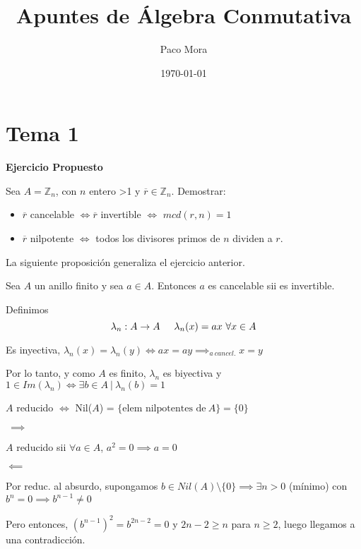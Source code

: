 \documentclass[openany]{book}
\title{Apuntes de Álgebra Conmutativa}
\author{Paco Mora}
\date{\today}
\begin{document}
\maketitle

\tableofcontents

\chapter{Tema 1}

\begin{exercise}
    \textbf{Ejercicio Propuesto}

    Sea $ A = \mathbb{Z}_{n} $, con $ n  $ entero >1 y $ \overline{r} \in \mathbb{Z}_{n} $. Demostrar:
    \begin{itemize}
        \item $ \overline{r} $ cancelable $ \iff \overline{r}$ invertible $ \iff $ $ mcd(r,n)=1 $
        \item $ \overline{r} $ nilpotente $ \iff $ todos los divisores primos de $ n $ dividen a $ r $.
    \end{itemize}
\end{exercise}

La siguiente proposición generaliza el ejercicio anterior.

\begin{proposition}
    Sea $ A  $ un anillo finito y sea $ a \in A $. Entonces $ a  $ es cancelable sii es invertible.
\end{proposition}

\begin{demonstration}

    Definimos
    $$ \lambda_n: A \to A\hspace{5mm} \lambda_n(x)=ax\ \forall x \in A$$

    Es inyectiva, $ \lambda_n(x) = \lambda_n(y) \iff ax = ay \implies_{a\ cancel.} x=y $

    Por lo tanto, y como $ A $ es finito, $ \lambda_n $ es biyectiva y $ 1 \in Im(\lambda_n) \iff \exists b \in A\ |\ \lambda_n(b)=1 $
\end{demonstration}


\begin{proposition}
    $ A $ reducido $ \iff $ Nil($ A $) = $ \{\text{elem nilpotentes de}\ A\} = \{0\} $
\end{proposition}

\begin{demonstration}

    $ \ \implies$

    $ A $ reducido sii $ \forall a \in A $, $ a^2=0 \implies a=0 $

    $ \impliedby $

    Por reduc. al absurdo, supongamos $ b \in Nil(A) \setminus \{0\}  \implies \exists n >0 $ (mínimo) con $ b^{n}=0 \implies b^{n-1} \ne 0 $

    Pero entonces, $ (b^{n-1})^{2} = b^{2n-2}=0  $ y $ 2n-2\geq n  $ para $ n\geq 2 $, luego llegamos a una contradicción.
\end{demonstration}
\end{document}
